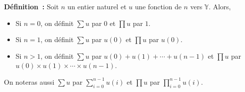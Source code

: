 \medskip

\noindent\textbf{Définition :} Soit $n$ un entier naturel et $u$ une fonction de $n$ vers $\mathbb{Y}$. 
    Alors, 
    \begin{itemize}[nosep]
        \item Si $n = 0$, on définit $\sum u$ par $0$ et $\prod u$ par $1$.
        \item Si $n = 1$, on définit $\sum u$ par $u(0)$ et $\prod u$ par $u(0)$.
        \item Si $n > 1$, on définit $\sum u$ par $u(0) + u(1) + \cdots + u(n-1)$ et $\prod u$ par $u(0) \times u(1) \times \cdots \times u(n-1)$.
    \end{itemize}
    On noteras aussi $\sum u$ par $\sum_{i=0}^{n-1} u(i)$ et $\prod u$ par $\prod_{i=0}^{n-1} u(i)$.
